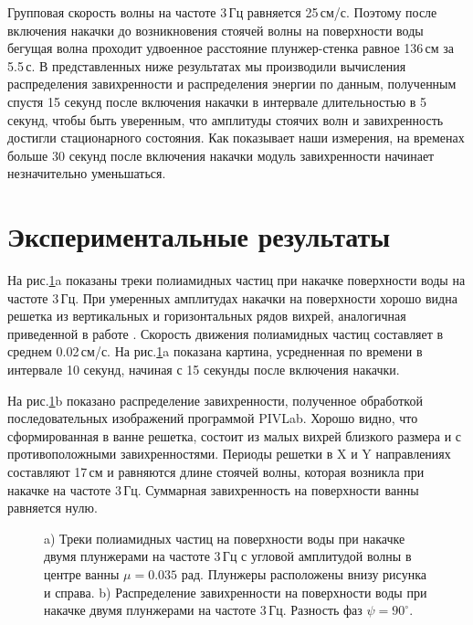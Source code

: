 Групповая скорость волны на частоте 3\,Гц равняется 25\,см/с. Поэтому после включения накачки до возникновения стоячей волны на поверхности воды бегущая волна проходит удвоенное расстояние плунжер-стенка равное 136\,см за 5.5\,с. В представленных ниже результатах мы производили вычисления распределения завихренности и распределения энергии по данным, полученным спустя 15 секунд после включения накачки в интервале длительностью в 5 секунд, чтобы быть уверенным, что амплитуды стоячих волн и завихренность достигли стационарного состояния. Как показывает наши измерения, на временах больше 30 секунд после включения накачки модуль завихренности начинает незначительно уменьшаться. 



\section{Экспериментальные результаты} \label{sect4_3}
На рис.\ref{img:vort_3Hz}a показаны треки полиамидных частиц при накачке поверхности воды на частоте 3\,Гц. При умеренных амплитудах накачки на поверхности хорошо видна решетка из вертикальных и горизонтальных рядов вихрей, аналогичная приведенной в работе \cite{kameke}. Скорость движения полиамидных частиц составляет в среднем 0.02\,см/с. На рис.\ref{img:vort_3Hz}a показана картина, усредненная по времени в интервале 10 секунд, начиная с 15 секунды после включения накачки.


На рис.\ref{img:vort_3Hz}b показано распределение завихренности, полученное обработкой последовательных изображений программой PIVLab. Хорошо видно, что сформированная в ванне решетка, состоит из малых вихрей близкого размера и с противоположными завихренностями. Периоды решетки в X и Y направлениях составляют 17\,см и равняются длине стоячей волны, которая возникла при накачке на частоте 3\,Гц. Суммарная завихренность на поверхности ванны равняется нулю. 

\begin{figure}[ht]
  \begin{minipage}[ht]{0.49\linewidth}
  \end{minipage}
  \hfill
  \begin{minipage}[ht]{0.49\linewidth}
  \end{minipage}
  \caption{a) Треки полиамидных частиц на поверхности воды при накачке двумя плунжерами на частоте 3\,Гц с угловой амплитудой волны в центре ванны $\mu = 0.035$ рад. Плунжеры расположены внизу рисунка и справа. b) Распределение завихренности на поверхности воды при накачке двумя плунжерами на частоте 3\,Гц. Разность фаз $\psi = 90^\circ$.}
  \label{img:vort_3Hz}  
\end{figure}



